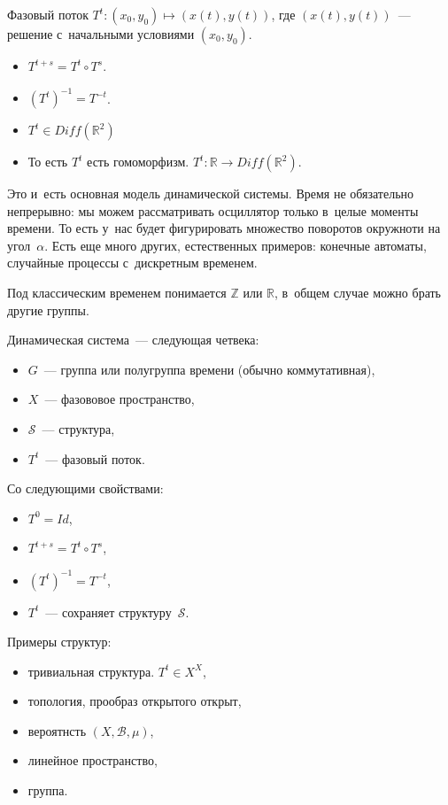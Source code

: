 \documentclass{article}
\begin{document}
\begin{definition}
	Фазовый поток $T^t: (x_0, y_0) \mapsto (x(t), y(t))$, где $(x(t), y(t))$~---
	решение с~начальными условиями $(x_0, y_0)$.
\end{definition}

\begin{itemize}
	\item $T^{t+s} = T^t \circ T^s$.
	\item $(T^t)^{-1} = T^{-t}$.
	\item $T^t \in Diff(\mathbb{R}^2)$
	\item То есть $T^t$ есть гомоморфизм. $T^t: \mathbb{R} \rightarrow
		Diff(\mathbb{R}^2)$.
\end{itemize}

Это и~есть основная модель динамической системы. Время не обязательно
непрерывно: мы можем рассматривать осциллятор только в~целые моменты времени.
То есть у~нас будет фигурировать множество поворотов окружноти на угол~$\alpha$.
Есть еще много других, естественных примеров: конечные автоматы, случайные
процессы с~дискретным временем.

Под классическим временем понимается $\mathbb{Z}$ или $\mathbb{R}$, в~общем
случае можно брать другие группы.

\begin{definition}
	Динамическая система~--- следующая четвека:
	\begin{itemize}
		\item $G$~--- группа или полугруппа времени (обычно коммутативная),
		\item $X$~--- фазововое пространство,
		\item $\mathcal{S}$~--- структура,
		\item $T^t$~--- фазовый поток.
	\end{itemize}
	Со следующими свойствами:
	\begin{itemize}
		\item $T^0 = Id$,
		\item $T^{t+s} = T^t \circ T^s$,
		\item $(T^t)^{-1} = T^{-t}$,
		\item $T^t$~--- сохраняет структуру~$\mathcal{S}$.
	\end{itemize}
\end{definition}
Примеры структур:
\begin{itemize}
	\item тривиальная структура. $T^t \in X^X$,
	\item топология, прообраз открытого открыт,
	\item вероятнсть $(X, \mathcal{B}, \mu)$,
	\item линейное пространство,
	\item группа.
\end{itemize}
\end{document}
